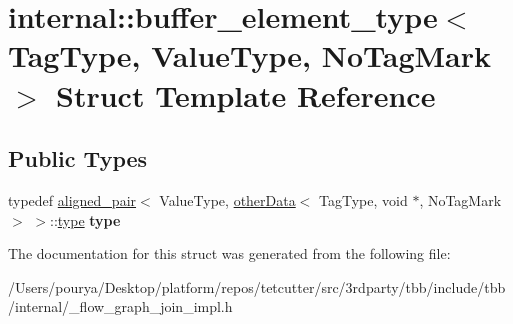\hypertarget{structinternal_1_1buffer__element__type}{}\section{internal\+:\+:buffer\+\_\+element\+\_\+type$<$ Tag\+Type, Value\+Type, No\+Tag\+Mark $>$ Struct Template Reference}
\label{structinternal_1_1buffer__element__type}
\subsection*{Public Types}
\begin{DoxyCompactItemize}
\item 
\hypertarget{structinternal_1_1buffer__element__type_a4d0023abeed9477b32424c354c36288b}{}typedef \hyperlink{structinternal_1_1aligned__pair}{aligned\+\_\+pair}$<$ Value\+Type, \hyperlink{structinternal_1_1otherData}{other\+Data}$<$ Tag\+Type, void $\ast$, No\+Tag\+Mark $>$ $>$\+::\hyperlink{structinternal_1_1type__plus__align}{type} {\bfseries type}\label{structinternal_1_1buffer__element__type_a4d0023abeed9477b32424c354c36288b}

\end{DoxyCompactItemize}


The documentation for this struct was generated from the following file\+:\begin{DoxyCompactItemize}
\item 
/\+Users/pourya/\+Desktop/platform/repos/tetcutter/src/3rdparty/tbb/include/tbb/internal/\+\_\+flow\+\_\+graph\+\_\+join\+\_\+impl.\+h\end{DoxyCompactItemize}
